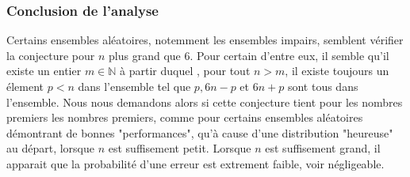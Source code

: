 \documentclass[../main.text]{report}
\begin{document}
\subsubsection{Conclusion de l'analyse}
Certains ensembles aléatoires, notemment les ensembles impairs, semblent vérifier la conjecture pour $n$ plus grand que 6. Pour certain d'entre eux, il semble qu'il existe un entier $m \in \mathbb{N}$ à partir duquel , pour tout $n > m$, il existe toujours un élement $p < n$ dans l'ensemble tel que $p, 6n-p$ et $6n+p$ sont tous dans l'ensemble. Nous nous demandons alors si cette conjecture tient pour les nombres premiers les nombres premiers, comme pour certains ensembles aléatoires démontrant de bonnes "performances", qu'à cause d'une distribution "heureuse" au départ, lorsque $n$ est suffisement petit. Lorsque $n$ est suffisement grand, il apparait que la probabilité d'une erreur est extrement faible, voir négligeable. 



\end{document}
